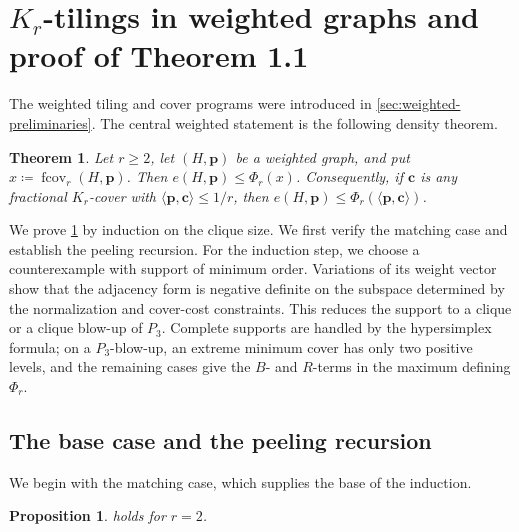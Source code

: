 \documentclass[10pt]{article}
\numberwithin{equation}{section}
\newtheorem{theorem}{Theorem}[section]
\newtheorem{proposition}[proposition]{Proposition}
\newcommand{\fcov}{\operatorname{fcov}}
\newcommand{\vct}[1]{\boldsymbol{#1}}
\begin{document}
\section{\texorpdfstring{$K_r$}{K-r}-tilings in weighted graphs and proof of Theorem 1.1}\label{sec:weighted-density}\label{sec:weighted-extremizer}

The weighted tiling and cover programs were introduced in \cref{sec:weighted-preliminaries}.  The central weighted statement is the following density theorem.

\begin{theorem}\label{thm:weighted-density}
Let $r\ge2$, let $(H,\vct p)$ be a weighted graph, and put $x\coloneqq\fcov_r(H,\vct p)$.  Then $e(H,\vct p)\le \Phi_r(x)$. 
Consequently, if $\vct c$ is any fractional $K_r$-cover with $\langle\vct p,\vct c\rangle\le1/r$, then $e(H,\vct p)\le \Phi_r(\langle\vct p,\vct c\rangle)$. 
\end{theorem}

We prove \cref{thm:weighted-density} by induction on the clique size.  We first verify the matching case and establish the peeling recursion.  For the induction step, we choose a counterexample with support of minimum order.  Variations of its weight vector show that the adjacency form is negative definite on the subspace determined by the normalization and cover-cost constraints.  This reduces the support to a clique or a clique blow-up of $P_3$.  Complete supports are handled by the hypersimplex formula; on a $P_3$-blow-up, an extreme minimum cover has only two positive levels, and the remaining cases give the $B$- and $R$-terms in the maximum defining $\Phi_r$.

\subsection{The base case and the peeling recursion}\label{sec:weighted-base-recursion}

We begin with the matching case, which supplies the base of the induction.

\begin{proposition}\label{prop:weighted-base}
 holds for $r=2$.
\end{proposition}
\end{document}

